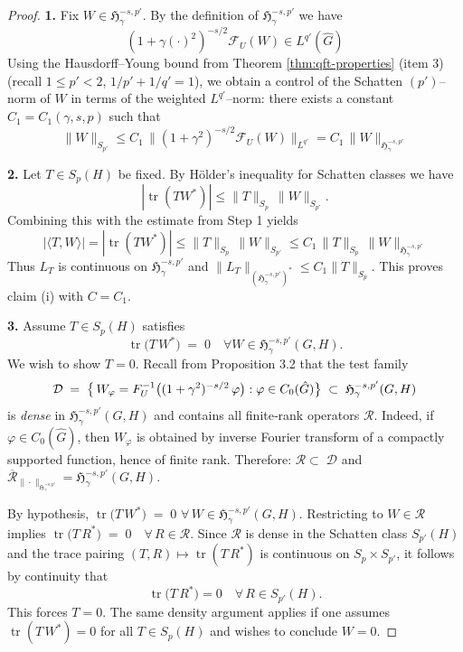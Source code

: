 \documentclass[11pt,a4paper]{article}
\theoremstyle{definition}
\newcommand{\F}{\mathcal{F}}
\begin{document}
\begin{proof}

\medskip\noindent\textbf{1.}
Fix $W\in \mathfrak{H}^{-s,p'}_{\gamma}$. By the definition of $\mathfrak{H}^{-s,p'}_{\gamma}$ we have
\[
(1+\gamma(\cdot)^2)^{-s/2}\F_U(W) \in L^{q'}(\widehat G)
\]
Using the Hausdorff--Young bound   from Theorem \ref{thm:qft-properties} (item 3) (recall $1\le p'\!<2$,
$1/p'+1/q'=1$), we obtain a control of the Schatten $(p')$–norm of $W$ in terms of the
weighted $L^{q'}$–norm: there exists a constant $C_1=C_1(\gamma,s,p)$ such that
\[
\|W\|_{S_{p'}} \le C_1\,\big\|(1+\gamma^2)^{-s/2}\F_U(W)\big\|_{L^{q'}} = C_1\,\|W\|_{\mathfrak{H}^{-s,p'}_{\gamma}}
\]


\medskip\noindent\textbf{2.}
Let $T\in S_p(H)$ be fixed. By Hölder's inequality for Schatten classes 
we have
\[
|\operatorname{tr}(T W^*)| \le \|T\|_{S_p}\,\|W\|_{S_{p'}}.
\]
Combining this with the estimate from Step 1 yields
\[
|\langle T,W\rangle| = |\operatorname{tr}(T W^*)|
\le \|T\|_{S_p}\,\|W\|_{S_{p'}}
\le C_1\,\|T\|_{S_p}\,\|W\|_{\mathfrak{H}^{-s,p'}_{\gamma}}
\]
Thus $L_T$ is continuous on $\mathfrak{H}^{-s,p'}_{\gamma}$ and
$\|L_T\|_{(\mathfrak{H}^{-s,p'}_{\gamma})^*}\le C_1\|T\|_{S_p}$. This proves claim (i) with $C=C_1$.

\medskip\noindent\textbf{3.}
Assume $T\in S_p(H)$ satisfies
\[
  \operatorname{tr}\bigl(T\,W^*\bigr) \;=\; 0
  \quad\forall W\in \mathfrak{H}^{-s,p'}_\gamma(G,H).
\]
We wish to show $T=0$. Recall from Proposition 3.2 that the test family
\[
  \mathcal{D}
  \;=\;\bigl\{\,W_\varphi = \mathcal \F_U^{-1}\bigl((1+\gamma^2)^{-s/2}\,\varphi\bigr)
    : \varphi\in C_0(\hat G)\bigr\}
  \;\subset\; \mathfrak{H}^{-s,p'}_\gamma(G,H)
\]
is \emph{dense} in $\mathfrak{H}^{-s,p'}_\gamma(G,H)$ and contains all finite‐rank operators $\mathcal{R}$.
Indeed, if $\varphi\in C_0(\hat G)$, then $W_\varphi$ is obtained by inverse Fourier
transform of a compactly supported function, hence of finite rank. Therefore: $\mathcal{R}\subset\;\mathcal{D}$ and $\overline{\mathcal{R}}_{\|\cdot\|_{\mathfrak{H}^{-s,p'}_\gamma}}=\mathfrak{H}^{-s,p'}_\gamma(G,H).$


By hypothesis, $\operatorname{tr}\bigl(T\,W^*\bigr) \;=\; 0 $ $\forall\,W\in \mathfrak{H}^{-s,p'}_\gamma(G,H).$
Restricting to $W\in\mathcal{R}$ implies $\operatorname{tr}\bigl(T\,R^*\bigr) \;=\;0
  \quad\forall\,R\in \mathcal{R}.$
Since $\mathcal{R}$ is dense in the Schatten class $S_{p'}(H)$ and the trace pairing $(T,R)\mapsto\operatorname{tr}(T\,R^*)$ is continuous on $S_p\times S_{p'}$,  it follows by continuity that
\[
  \operatorname{tr}\bigl(T\,R^*\bigr) =0
  \quad\forall\,R\in S_{p'}(H).
\]
This forces $T=0$. The same density argument applies if one assumes $\operatorname{tr}(T\,W^*)=0$ for all $T\in S_p(H)$ and wishes to conclude $W=0$.




\end{proof}
\end{document}

